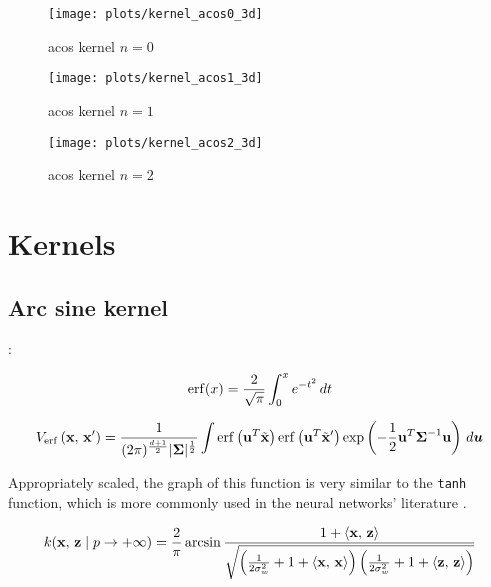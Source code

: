 \begin{figure}
    \texttt{[image: plots/kernel\_acos0\_3d]}
    \caption{acos kernel $n=0$}
\end{figure}

\begin{figure}
    \texttt{[image: plots/kernel\_acos1\_3d]}
    \caption{acos kernel $n=1$}
\end{figure}

\begin{figure}
    \texttt{[image: plots/kernel\_acos2\_3d]}
    \caption{acos kernel $n=2$}
\end{figure}

\section{Kernels}
\subsection{Arc sine kernel}

\textcite{frenayParameterinsensitiveKernelExtreme2011,williamsComputationInfiniteNeural1998}:


\begin{equation}
    \operatorname{erf}(x) = \frac{2}{\sqrt{\pi}} \int_0^x e^{-t^2} \,dt
\end{equation}


\begin{equation}
    V_{\operatorname{erf}}\left(\mathbf{x},\,\mathbf{x}'\right) =
    \frac{1}{(2\pi)^{\frac{d+1}{2}} |\boldsymbol \Sigma|^{\frac{1}{2}}}
    \int
    \operatorname{erf} \left(\mathbf{u} ^T \tilde {\mathbf{x}} \right)
    \operatorname{erf} \left(\mathbf{u} ^T \tilde {\mathbf{x}} '\right)
    \exp \left(
    -\frac{1}{2} \mathbf{u} ^T \boldsymbol \Sigma^{-1} \mathbf{u}
    \right)
    \,d\boldsymbol u
\end{equation}

Appropriately scaled, the graph of this function is very similar to the
\texttt{tanh} function, which is more commonly used in the neural networks'
literature \cite{williamsComputationInfiniteNeural1998}.

\begin{equation}
    k(\mathbf{x},\,\mathbf{z} \mid p \to + \infty)  = \frac{2}{\pi}
    \arcsin \frac{1 + \left\langle \mathbf{x},\,\mathbf{z} \right\rangle}{\sqrt{
            \left(
            \frac{1}{2\sigma_w^2} + 1 + \left\langle \mathbf{x},\,\mathbf{x} \right\rangle
            \right)
            \left(
            \frac{1}{2\sigma_w^2} + 1 + \left\langle \mathbf{z},\,\mathbf{z} \right\rangle
            \right)
        }}
\end{equation}


